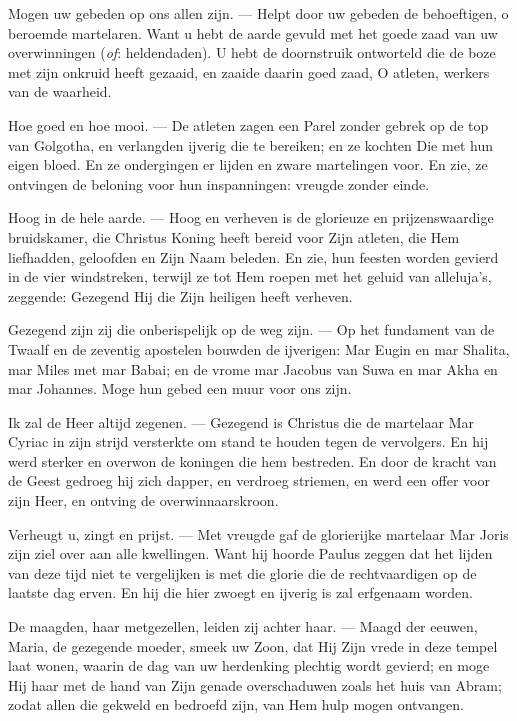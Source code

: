 \documentclass[12pt,twoside,a5paper]{article}
\newlength{\origparskip}
\newenvironment{halfparskip}{
  \setlength{\parskip}{0.5\origparskip}
}{
  \setlength{\parskip}{\origparskip}
}
\begin{document}
\begin{halfparskip}
  Mogen uw gebeden op ons allen zijn. --- Helpt door uw gebeden de behoeftigen, o beroemde martelaren. Want u hebt de aarde gevuld met het goede zaad van uw overwinningen (\emph{of}: heldendaden). U hebt de doornstruik ontworteld die de boze met zijn onkruid heeft gezaaid, en zaaide daarin goed zaad, O atleten, werkers van de waarheid.

  Hoe goed en hoe mooi. --- De atleten zagen een Parel zonder gebrek op de top van Golgotha, en verlangden ijverig die te bereiken; en ze kochten Die met hun eigen bloed. En ze ondergingen er lijden en zware martelingen voor. En zie, ze ontvingen de beloning voor hun inspanningen: vreugde zonder einde.

  Hoog in de hele aarde. --- Hoog en verheven is de glorieuze en prijzenswaardige bruidskamer, die Christus Koning heeft bereid voor Zijn atleten, die Hem liefhadden, geloofden en Zijn Naam beleden. En zie, hun feesten worden gevierd in de vier windstreken, terwijl ze tot Hem roepen met het geluid van alleluja's, zeggende: Gezegend Hij die Zijn heiligen heeft verheven.

  Gezegend zijn zij die onberispelijk op de weg zijn. --- Op het fundament van de Twaalf en de zeventig apostelen bouwden de ijverigen: Mar Eugin en mar Shalita, mar Miles met mar Babai; en de vrome mar Jacobus van Suwa en mar Akha en mar Johannes. Moge hun gebed een muur voor ons zijn.

  Ik zal de Heer altijd zegenen. --- Gezegend is Christus die de martelaar Mar Cyriac in zijn strijd versterkte om stand te houden tegen de vervolgers. En hij werd sterker en overwon de koningen die hem bestreden. En door de kracht van de Geest gedroeg hij zich dapper, en verdroeg striemen, en werd een offer voor zijn Heer, en ontving de overwinnaarskroon.

  Verheugt u, zingt en prijst. --- Met vreugde gaf de glorierijke martelaar Mar Joris zijn ziel over aan alle kwellingen. Want hij hoorde Paulus zeggen dat het lijden van deze tijd niet te vergelijken is met die glorie die de rechtvaardigen op de laatste dag erven. En hij die hier zwoegt en ijverig is zal erfgenaam worden.

  De maagden, haar metgezellen, leiden zij achter haar. --- Maagd der eeuwen, Maria, de gezegende moeder, smeek uw Zoon, dat Hij Zijn vrede in deze tempel laat wonen, waarin de dag van uw herdenking plechtig wordt gevierd; en moge Hij haar met de hand van Zijn genade overschaduwen zoals het huis van Abram; zodat allen die gekweld en bedroefd zijn, van Hem hulp mogen ontvangen.


\end{halfparskip}
\end{document}
